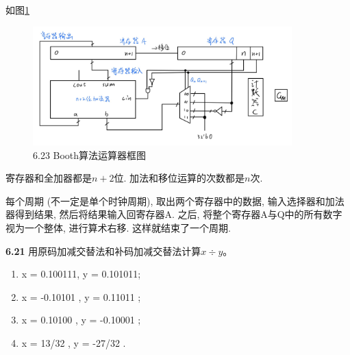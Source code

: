 \documentclass[UTF8]{report}
\newcommand{\problem}[1]{{\setlength{\parskip}{10pt}\noindent \bf{#1}}}
\newenvironment{solution}{{\noindent\hskip 2em \bf 解 \quad}}{}
\begin{document}
\begin{solution}
    如图\ref{fig:6_23}
    \begin{figure}[htb]
        \centering
        \includegraphics[width=10cm]{fig/6.23.jpg}
        \caption{6.23 Booth算法运算器框图}
        \label{fig:6_23}
    \end{figure}

    寄存器和全加器都是$n+2$位. 加法和移位运算的次数都是$n$次. 

    每个周期 (不一定是单个时钟周期), 取出两个寄存器中的数据, 输入选择器和加法器得到结果, 然后将结果输入回寄存器A. 之后, 将整个寄存器A与Q中的所有数字视为一个整体, 进行算术右移. 这样就结束了一个周期.
\end{solution}


\problem{6.21} 用原码加减交替法和补码加减交替法计算$x\div y$。

\begin{enumerate}
    \item x =  0.100111, y =  0.101011;
    \item x = -0.10101 , y =  0.11011 ;
    \item x =  0.10100 , y = -0.10001 ;
    \item x =  13/32   , y = -27/32   .
\end{enumerate}
\end{document}

